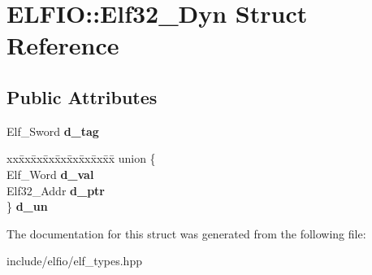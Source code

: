 \hypertarget{struct_e_l_f_i_o_1_1_elf32___dyn}{}\section{E\+L\+F\+IO\+:\+:Elf32\+\_\+\+Dyn Struct Reference}
\label{struct_e_l_f_i_o_1_1_elf32___dyn}
\subsection*{Public Attributes}
\begin{DoxyCompactItemize}
\item 
Elf\+\_\+\+Sword {\bfseries d\+\_\+tag}\hypertarget{struct_e_l_f_i_o_1_1_elf32___dyn_af79e800c6c0c2a82b0132a821bcacfd1}{}\label{struct_e_l_f_i_o_1_1_elf32___dyn_af79e800c6c0c2a82b0132a821bcacfd1}

\item 
\begin{tabbing}
xx\=xx\=xx\=xx\=xx\=xx\=xx\=xx\=xx\=\kill
union \{\\
\>Elf\_Word {\bfseries d\_val}\\
\>Elf32\_Addr {\bfseries d\_ptr}\\
\} {\bfseries d\_un}\hypertarget{struct_e_l_f_i_o_1_1_elf32___dyn_a9998b398462532371b794a6f32c0c420}{}\label{struct_e_l_f_i_o_1_1_elf32___dyn_a9998b398462532371b794a6f32c0c420}
\\

\end{tabbing}\end{DoxyCompactItemize}


The documentation for this struct was generated from the following file\+:\begin{DoxyCompactItemize}
\item 
include/elfio/elf\+\_\+types.\+hpp\end{DoxyCompactItemize}
